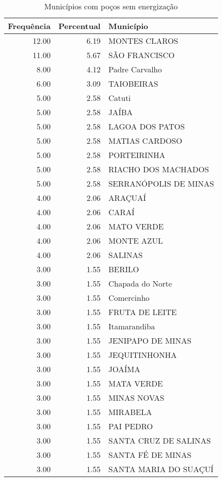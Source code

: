 \documentclass[a4paper, 12pt, openright, oneside, english, brazil, article]{abntex2}
\begin{document}
	\begin{scriptsize}
	\begin{longtable}{rrl}
		\caption{Municípios com poços sem energização} \\ 
		\hline
		Frequência & Percentual & Município \\ 
		\hline
		12.00 & 6.19 & MONTES CLAROS \\ 
		11.00 & 5.67 & SÃO FRANCISCO \\ 
		8.00 & 4.12 & Padre Carvalho \\ 
		6.00 & 3.09 & TAIOBEIRAS \\ 
		5.00 & 2.58 & Catuti \\ 
		5.00 & 2.58 & JAÍBA \\ 
		5.00 & 2.58 & LAGOA DOS PATOS \\ 
		5.00 & 2.58 & MATIAS CARDOSO \\ 
		5.00 & 2.58 & PORTEIRINHA \\ 
		5.00 & 2.58 & RIACHO DOS MACHADOS \\ 
		5.00 & 2.58 & SERRANÓPOLIS DE MINAS \\ 
		4.00 & 2.06 & ARAÇUAÍ \\ 
		4.00 & 2.06 & CARAÍ \\ 
		4.00 & 2.06 & MATO VERDE \\ 
		4.00 & 2.06 & MONTE AZUL \\ 
		4.00 & 2.06 & SALINAS \\ 
		3.00 & 1.55 & BERILO \\ 
		3.00 & 1.55 & Chapada do Norte \\ 
		3.00 & 1.55 & Comercinho \\ 
		3.00 & 1.55 & FRUTA DE LEITE \\ 
		3.00 & 1.55 & Itamarandiba \\ 
		3.00 & 1.55 & JENIPAPO DE MINAS \\ 
		3.00 & 1.55 & JEQUITINHONHA \\ 
		3.00 & 1.55 & JOAÍMA \\ 
		3.00 & 1.55 & MATA VERDE \\ 
		3.00 & 1.55 & MINAS NOVAS \\ 
		3.00 & 1.55 & MIRABELA \\ 
		3.00 & 1.55 & PAI PEDRO \\ 
		3.00 & 1.55 & SANTA CRUZ DE SALINAS \\ 
		3.00 & 1.55 & SANTA FÉ DE MINAS \\ 
		3.00 & 1.55 & SANTA MARIA DO SUAÇUÍ \\ 

\end{longtable}
\end{scriptsize}
\end{document}
